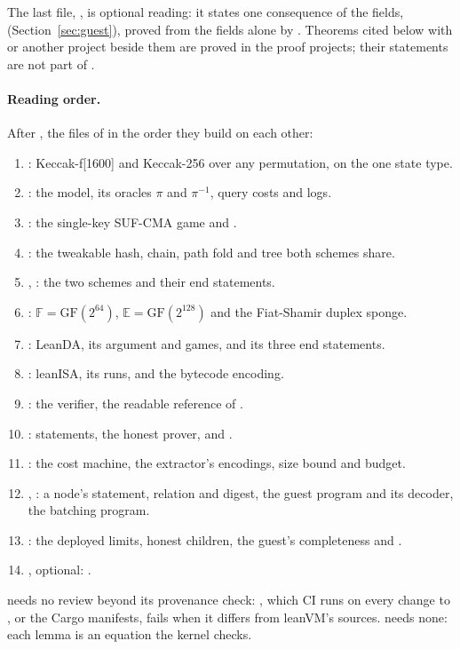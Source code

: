 \documentclass[11pt]{article}
\begin{document}
The last file, , is optional reading: it states one
consequence of the fields,  (Section~\ref{sec:guest}), proved from the
fields alone by
. Theorems cited below with  or another
project beside them are proved in the proof projects; their statements are not part of
.

\paragraph{Reading order.} After , the files of  in the order they build on each other:
\begin{enumerate}\itemsep0pt
\item {}: Keccak-f[1600] and Keccak-256 over any permutation, on the one state type.
\item {}: the model, its oracles $\pi$ and $\pi^{-1}$, query costs and logs.
\item {}: the single-key SUF-CMA game and .
\item {}: the tweakable hash, chain, path fold and tree both schemes share.
\item {}, : the two schemes and their end statements.
\item {}: $\mathbb{F} = \mathrm{GF}(2^{64})$, $\mathbb{E} = \mathrm{GF}(2^{128})$ and the Fiat-Shamir duplex sponge.
\item {}: LeanDA, its argument and games, and its three end statements.
\item {}: leanISA, its runs,  and the bytecode encoding.
\item {}: the verifier, the readable reference of .
\item {}: statements, the honest prover,  and .
\item {}: the cost machine, the extractor's encodings, size bound and budget.
\item {}, : a node's statement, relation and digest, the guest program and its decoder, the batching program.
\item {}: the deployed limits, honest children, the guest's completeness and .
\item {}, optional: .
\end{enumerate}
 needs no review beyond its provenance check: , which CI runs on every change to ,  or the Cargo manifests, fails when it differs from leanVM's sources.  needs none: each  lemma is an equation the kernel checks.
\end{document}
